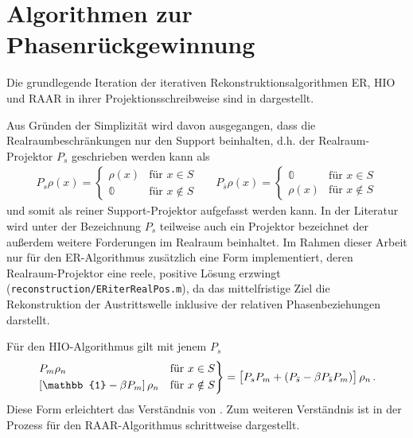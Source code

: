 \chapter{Algorithmen zur Phasenrückgewinnung}
\label{chap:anhang_algos}
Die grundlegende Iteration der iterativen Rekonstruktionsalgorithmen ER, HIO und RAAR in ihrer Projektionsschreibweise sind in  dargestellt.

 Aus Gründen der Simplizität wird davon ausgegangen, dass die Realraumbeschränkungen nur den Support beinhalten, d.h. der Realraum-Projektor $P_s$ geschrieben werden kann als 
 \begin{align}
 P_s\rho (x)=\begin{cases}
  \rho (x)  &\text{für } x\in S\\
  \mathbb{0}  &\text{für }x\notin S
 \end{cases}&&
   P_{\bar{s}}\rho (x)=\begin{cases}
   	\mathbb{0} &\text{für } x\in S\\
   	\rho (x)   &\text{für }x\notin S
   	\end{cases}
 \end{align}
  und somit als reiner Support-Projektor aufgefasst werden kann. In der Literatur wird unter der Bezeichnung $P_s$ teilweise auch ein Projektor bezeichnet der außerdem weitere Forderungen im Realraum beinhaltet. Im Rahmen dieser Arbeit nur für den ER-Algorithmus zusätzlich eine Form implementiert, deren Realraum-Projektor eine reele, positive Lösung erzwingt (\texttt{reconstruction/ERiterRealPos.m}), da das mittelfristige Ziel die Rekonstruktion der Austrittswelle inklusive der relativen Phasenbeziehungen darstellt.
 
	Für den HIO-Algorithmus gilt mit jenem $P_s$ 
	\begin{align*}
	\begin{rcases}	
	P_m\rho_n  &\text{für } x\in S\\
	\left[\mathbb{1}-\beta P_m\right]\rho_n &\text{für } x\notin S
	\end{rcases}	
	=\left[P_sP_m+\left(P_{\bar{s}}-\beta P_{\bar{s}} P_m\right)\right]\rho_n
	\,.
	\end{align*}
	Diese Form erleichtert das Verständnis von . Zum weiteren Verständnis ist in  der Prozess für den RAAR-Algorithmus schrittweise dargestellt.
	
